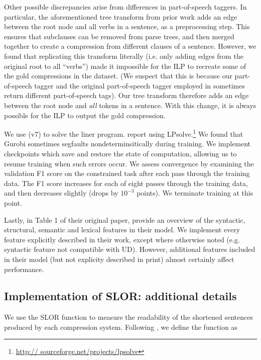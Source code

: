 Other possible discrepancies arise from differences in part-of-speech taggers. In particular, the aforementioned tree transform from prior work adds an edge between the root node and all verbs in a sentence, as a preprocessing step. This ensures that subclauses can be removed from parse trees, and then merged together to create a compression from different clauses of a sentence. However, we found that replicating this transform literally (i.e. only adding edges from the original root to all ``verbs'') made it impossible for the ILP to recreate some of the gold compressions in the dataset. (We suspect that this is because our part-of-speech tagger and the original part-of-speech tagger employed in \citet{filippova2013overcoming} sometimes return different part-of-speech tags). Our tree transform therefore adds an edge between the root node and \textit{all} tokens in a sentence. With this change, it is always possible for the ILP to output the gold compression.

We use \citet{gurobi} (v7) to solve the liner program. \citet{filippova2008dependency} report using LPsolve.\footnote{\url{http://
sourceforge.net/projects/lpsolve}}  We found that Gurobi sometimes segfaults nondeterminsitically during training. We implement checkpoints which save and restore the state of computation, allowing us to resume training when such errors occur.  We assess convergence by examining the validation F1 score on the constrained task after each pass through the training data. The F1 score increases for each of eight passes through the training data, and then decreases slightly (drops by $10^{-3}$ points). We terminate training at this point. 

Lastly, in Table 1 of their original paper, \citet{filippova2013overcoming} provide an overview of the syntactic, structural, semantic and lexical features in their model. We implement every feature explicitly described in their work, except where otherwise noted (e.g. syntactic feature not compatible with UD). However, additional features included in their model (but not explicity described in print) almost certainly affect performance. 

\subsection{Implementation of SLOR: additional details}

We use the SLOR function to measure the readability of the shortened sentences produced by each compression system. Following \cite{lau2015unsupervised}, we define the function as 

